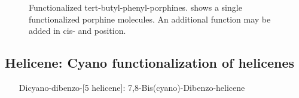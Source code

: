 \begin{figure}[]\centering
	\caption{Functionalized tert-butyl-phenyl-porphines.  shows a single functionalized porphine molecules. An additional function may be added in  cis-  and  position.}
	\label{fig:TBP}
\end{figure}	
	\subsection{Helicene: Cyano functionalization of helicenes}
	\label{sec:helicene}
	\begin{itemize}
		\item[Dicyano-dibenzo-[5]helicene]: 7,8-Bis(cyano)-Dibenzo-helicene
	\end{itemize}
	
